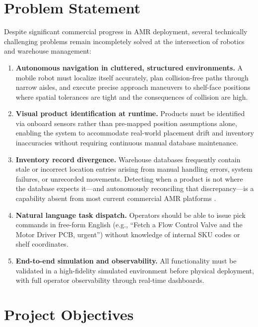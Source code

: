 \documentclass[12pt,a4paper]{report}
\begin{document}
\section{Problem Statement}

Despite significant commercial progress in AMR deployment, several technically challenging problems remain incompletely solved at the intersection of robotics and warehouse management:

\begin{enumerate}[leftmargin=*, label=\textbf{\arabic*.}]
    \item \textbf{Autonomous navigation in cluttered, structured environments.} A mobile robot must localize itself accurately, plan collision-free paths through narrow aisles, and execute precise approach maneuvers to shelf-face positions where spatial tolerances are tight and the consequences of collision are high.

    \item \textbf{Visual product identification at runtime.} Products must be identified via onboard sensors rather than pre-mapped position assumptions alone, enabling the system to accommodate real-world placement drift and inventory inaccuracies without requiring continuous manual database maintenance.

    \item \textbf{Inventory record divergence.} Warehouse databases frequently contain stale or incorrect location entries arising from manual handling errors, system failures, or unrecorded movements. Detecting when a product is not where the database expects it—and autonomously reconciling that discrepancy—is a capability absent from most current commercial AMR platforms \citep{fragapane2021}.

    \item \textbf{Natural language task dispatch.} Operators should be able to issue pick commands in free-form English (e.g., ``Fetch a Flow Control Valve and the Motor Driver PCB, urgent'') without knowledge of internal SKU codes or shelf coordinates.

    \item \textbf{End-to-end simulation and observability.} All functionality must be validated in a high-fidelity simulated environment before physical deployment, with full operator observability through real-time dashboards.
\end{enumerate}

\section{Project Objectives}
\end{document}
